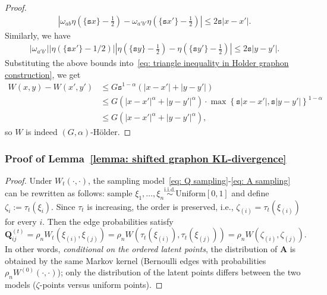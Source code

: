 \documentclass[11pt]{article}
\newcommand{\bQ}{\bm{Q}}
\newcommand{\<}{\langle}
\renewcommand{\>}{\rangle}
\newcommand{\ts}{\mathtt{s}}
\theoremstyle{plain}
\theoremstyle{definition}
\theoremstyle{remark}
\begin{document}
{\begin{proof}
\begin{align*}
    \left |\omega_{ab} \eta\left (\{\ts x\} - \frac{1}{2} \right ) - \omega_{a' b'}\eta \left (\{\ts x'\} - \frac{1}{2} \right ) \right | \le 2 \ts |x - x'|.
\end{align*}
Similarly, we have
\begin{align*}
   |\omega_{a'b'}| |\eta \left ( \{\ts x' \} - 1/2\right )| |\eta \left (\{\ts y\} - \frac{1}{2}\right ) - \eta \left  (\{\ts y'\} - \frac{1}{2} \right )| \le 2 \ts |y - y'|.
\end{align*}
Substituting the above bounds into~\eqref{eq: triangle inequality in Holder graphon construction}, we get
\begin{align*}
     W (x, y) - W(x', y') & \le G \ts^{1-\alpha} (|x - x'| + |y - y'|) \\
     & \le G (|x - x'|^\alpha + |y - y'|^\alpha) \cdot \max \left \{ \ts |x - x'|, \ts |y - y'| \right \}^{1 - \alpha} \\
     & \le G (|x - x'|^\alpha + |y - y'|^\alpha),
\end{align*}
so $W$ is indeed $(G, \alpha)$-H\"older.
\end{proof}

\subsubsection{Proof of Lemma~\ref{lemma: shifted graphon KL-divergence}}
\label{section: proof of shifted graphon KL-divergence}

\begin{proof}
    Under $W_t(\cdot, \cdot)$, the sampling model~\eqref{eq: Q sampling}-\eqref{eq: A sampling} can be rewritten as follows:
	sample $\xi_1,\dots,\xi_n\stackrel{\text{i.i.d.}}{\sim}\mathrm{Uniform}[0,1]$ and define
	$\zeta_i := \tau_t(\xi_i)$. Since $\tau_t$ is increasing, the order is preserved, i.e.,
	$\zeta_{(i)}=\tau_t(\xi_{(i)})$ for every $i$.
	Then the edge probabilities satisfy
	\[
	\bQ^{(t)}_{ij} = \rho_n W_{t}(\xi_{(i)},\xi_{(j)})
	= \rho_n W(\tau_t(\xi_{(i)}),\tau_t(\xi_{(j)}))
	= \rho_n W(\zeta_{(i)},\zeta_{(j)}).
	\]
	In other words, \emph{conditional on the ordered latent points}, the distribution of $\mathbf A$ is obtained by the
	same Markov kernel (Bernoulli edges with probabilities $\rho_n W^{(0)}(\cdot,\cdot)$); only the distribution of the
	latent points differs between the two models ($\zeta$-points versus uniform points).
	

\end{proof}}
\end{document}

